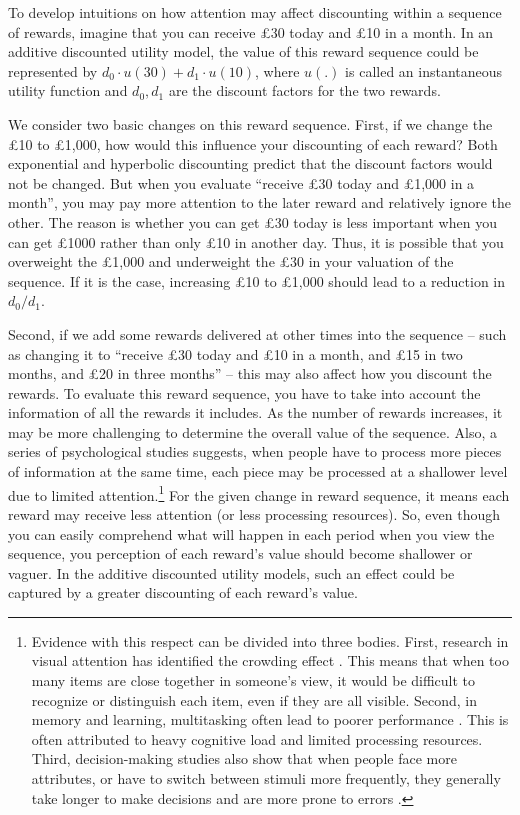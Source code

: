 \documentclass[
  12pt,
]{article}
\begin{document}
To develop intuitions on how attention may affect discounting within a
sequence of rewards, imagine that you can receive £30 today and £10 in a
month. In an additive discounted utility model, the value of this reward
sequence could be represented by \(d_0 \cdot u(30) + d_1 \cdot u(10)\),
where \(u(.)\) is called an instantaneous utility function and
\(d_0,d_1\) are the discount factors for the two rewards.

We consider two basic changes on this reward sequence. First, if we
change the £10 to £1,000, how would this influence your discounting of
each reward? Both exponential and hyperbolic discounting predict that
the discount factors would not be changed. But when you evaluate
``receive £30 today and £1,000 in a month'', you may pay more attention
to the later reward and relatively ignore the other. The reason is
whether you can get £30 today is less important when you can get £1000
rather than only £10 in another day. Thus, it is possible that you
overweight the £1,000 and underweight the £30 in your valuation of the
sequence. If it is the case, increasing £10 to £1,000 should lead to a
reduction in \(d_0/d_1\).

Second, if we add some rewards delivered at other times into the
sequence -- such as changing it to ``receive £30 today and £10 in a
month, and £15 in two months, and £20 in three months'' -- this may also
affect how you discount the rewards. To evaluate this reward sequence,
you have to take into account the information of all the rewards it
includes. As the number of rewards increases, it may be more challenging
to determine the overall value of the sequence. Also, a series of
psychological studies suggests, when people have to process more pieces
of information at the same time, each piece may be processed at a
shallower level due to limited attention.\footnote{Evidence with this
  respect can be divided into three bodies. First, research in visual
  attention has identified the crowding effect
  \citep{whitney2011visual}. This means that when too many items are
  close together in someone's view, it would be difficult to recognize
  or distinguish each item, even if they are all visible. Second, in
  memory and learning, multitasking often lead to poorer performance
  \citep[e.g. the split-attention effect, see][]{sweller1998cognitive,sweller2011cognitive}.
  This is often attributed to heavy cognitive load and limited
  processing resources. Third, decision-making studies also show that
  when people face more attributes, or have to switch between stimuli
  more frequently, they generally take longer to make decisions and are
  more prone to errors
  \citep{malhotra1982information, kool2010decision}.} For the given
change in reward sequence, it means each reward may receive less
attention (or less processing resources). So, even though you can easily
comprehend what will happen in each period when you view the sequence,
you perception of each reward's value should become shallower or vaguer.
In the additive discounted utility models, such an effect could be
captured by a greater discounting of each reward's value.
\end{document}
